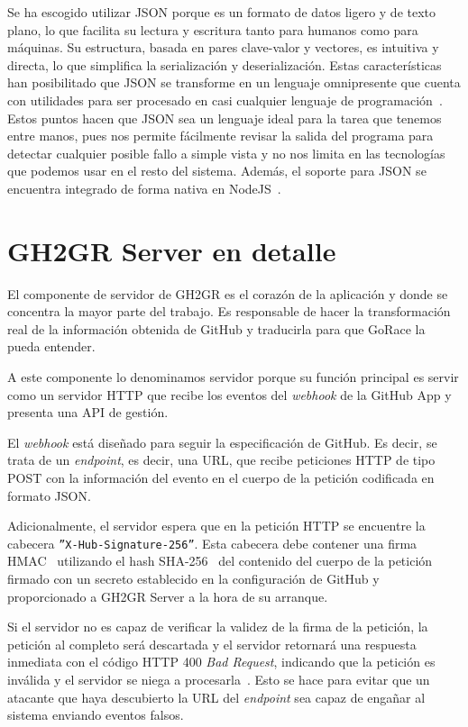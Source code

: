Se ha escogido utilizar \acrshort{JSON} porque es un formato de datos ligero y de texto plano, lo que facilita su lectura y escritura tanto para humanos como para máquinas. Su estructura, basada en pares clave-valor y vectores, es intuitiva y directa, lo que simplifica la serialización y deserialización. Estas características han posibilitado que \acrshort{JSON} se transforme en un lenguaje omnipresente que cuenta con utilidades para ser procesado en casi cualquier lenguaje de programación~\cite{jsonJSON}. Estos puntos hacen que \acrshort{JSON} sea un lenguaje ideal para la tarea que tenemos entre manos, pues nos permite fácilmente revisar la salida del programa para detectar cualquier posible fallo a simple vista y no nos limita en las tecnologías que podemos usar en el resto del sistema. Además, el soporte para \acrshort{JSON} se encuentra integrado de forma nativa en NodeJS~\cite{ecma262}.

\section{GH2GR Server en detalle}
El componente de servidor de GH2GR es el corazón de la aplicación y donde se concentra la mayor parte del trabajo. Es responsable de hacer la transformación real de la información obtenida de GitHub y traducirla para que GoRace la pueda entender.

A este componente lo denominamos servidor porque su función principal es servir como un servidor \acrshort{HTTP} que recibe los eventos del \textit{webhook} de la GitHub App y presenta una \acrshort{API} de gestión.

El \textit{webhook} está diseñado para seguir la especificación de GitHub. Es decir, se trata de un \textit{endpoint}, es decir, una \acrshort{URL}, que recibe peticiones \acrshort{HTTP} de tipo POST con la información del evento en el cuerpo de la petición codificada en formato \acrshort{JSON}. 

Adicionalmente, el servidor espera que en la petición \acrshort{HTTP} se encuentre la cabecera {\tt ''X-Hub-Signature-256''}. Esta cabecera debe contener una firma \acrshort{HMAC}~\cite{rfc2104} utilizando el hash SHA-256~\cite{Dang2015} del contenido del cuerpo de la petición firmado con un secreto establecido en la configuración de GitHub y proporcionado a GH2GR Server a la hora de su arranque. 

Si el servidor no es capaz de verificar la validez de la firma de la petición, la petición al completo será descartada y el servidor retornará una respuesta inmediata con el código \acrshort{HTTP} 400 \textit{Bad Request}, indicando que la petición es inválida y el servidor se niega a procesarla~\cite{rfc7231}. Esto se hace para evitar que un atacante que haya descubierto la \acrshort{URL} del \textit{endpoint} sea capaz de engañar al sistema enviando eventos falsos.

